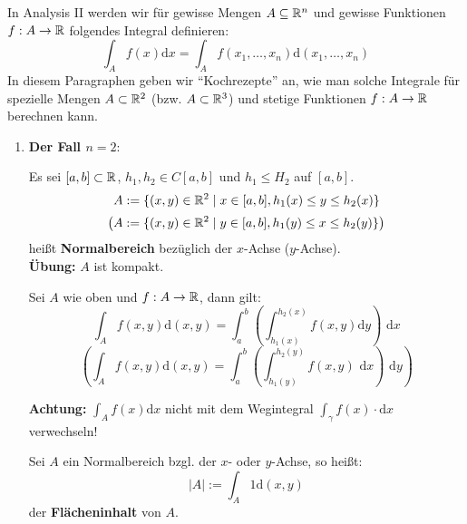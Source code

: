 \documentclass[a4paper,twoside,DIV15,BCOR12mm,chapterprefix=true,headings=twolinechapter]{scrbook}
\begin{document}
In Analysis II werden wir für gewisse Mengen $A\subseteq\mathbb{R}^n$ und gewisse Funktionen
$f:A\to\mathbb{R}$ folgendes Integral definieren:
\[\int_A f(x)\text{d}x=\int_A f(x_1,\ldots,x_n)\text{d}(x_1,\ldots,x_n)\]
In diesem Paragraphen geben wir "`Kochrezepte"' an, wie man solche Integrale
für spezielle Mengen $A\subset\mathbb{R}^2$ (bzw. $A\subset\mathbb{R}^3$) und stetige Funktionen
$f:A\to\mathbb{R}$ berechnen kann.

\renewcommand{\theenumi}{\Roman{enumi}}
\renewcommand{\labelenumi}{\theenumi}

\begin{enumerate}
\item \textbf{Der Fall $n=2$}:\\
\begin{definition*}
Es sei $[a,b]\subset\mathbb{R}$, $h_1,h_2\in C[a,b]$ und $h_1\le H_2$ auf $[a,b]$.
\[A:=\{(x,y)\in\mathbb{R}^2\mid x\in[a,b],h_1(x)\le y\le h_2(x)\}\]
\[\left(A:=\{(x,y)\in\mathbb{R}^2\mid y\in[a,b],h_1(y)\le x\le h_2(y)\}\right)\]
heißt \textbf{Normalbereich} bezüglich der $x$-Achse ($y$-Achse).\\
\textbf{Übung:} $A$ ist kompakt.
\end{definition*}

\begin{satz}
Sei $A$ wie oben und $f:A\to\mathbb{R}$, dann gilt:
\[\int_A f(x,y)\text{d}(x,y)=\int_a^b\left(\int_{h_1(x)}^{h_2(x)} f(x,y)\text{d}y\right)\text{ d}x\]
\[\left(\int_A f(x,y)\text{d}(x,y)=\int_a^b\left(\int_{h_1(y)}^{h_2(y)} f(x,y)\text{ d}x\right)\text{ d}y\right)\]
\end{satz}

\textbf{Achtung:} $\int_A f(x)\text{d}x$ nicht mit dem Wegintegral $\int_\gamma f(x)\cdot\text{d}x$
verwechseln!

\begin{definition*}
Sei $A$ ein Normalbereich bzgl. der $x$- oder $y$-Achse, so heißt:
\[|A|:=\int_A 1\text{d}(x,y)\]
der \textbf{Flächeninhalt} von $A$.
\end{definition*}


\end{enumerate}
\end{document}
